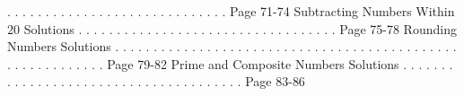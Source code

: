\documentclass{article}%
\begin{document}
.%
.%
.%
.%
.%
.%
.%
.%
.%
.%
.%
.%
.%
.%
.%
.%
.%
.%
.%
.%
.%
.%
.%
.%
.%
.%
.%
.%
.%
Page 71{-}74%
\newline%
Subtracting Numbers Within 20 Solutions%
.%
.%
.%
.%
.%
.%
.%
.%
.%
.%
.%
.%
.%
.%
.%
.%
.%
.%
.%
.%
.%
.%
.%
.%
.%
.%
.%
.%
.%
.%
.%
.%
.%
.%
Page 75{-}78%
\newline%
Rounding Numbers Solutions%
.%
.%
.%
.%
.%
.%
.%
.%
.%
.%
.%
.%
.%
.%
.%
.%
.%
.%
.%
.%
.%
.%
.%
.%
.%
.%
.%
.%
.%
.%
.%
.%
.%
.%
.%
.%
.%
.%
.%
.%
.%
.%
.%
.%
.%
.%
.%
.%
.%
.%
.%
.%
.%
.%
.%
.%
.%
.%
Page 79{-}82%
\newline%
Prime and Composite Numbers Solutions%
.%
.%
.%
.%
.%
.%
.%
.%
.%
.%
.%
.%
.%
.%
.%
.%
.%
.%
.%
.%
.%
.%
.%
.%
.%
.%
.%
.%
.%
.%
.%
.%
.%
.%
.%
.%
.%
.%
Page 83{-}86%
\newline%
\newpage
\end{document}

